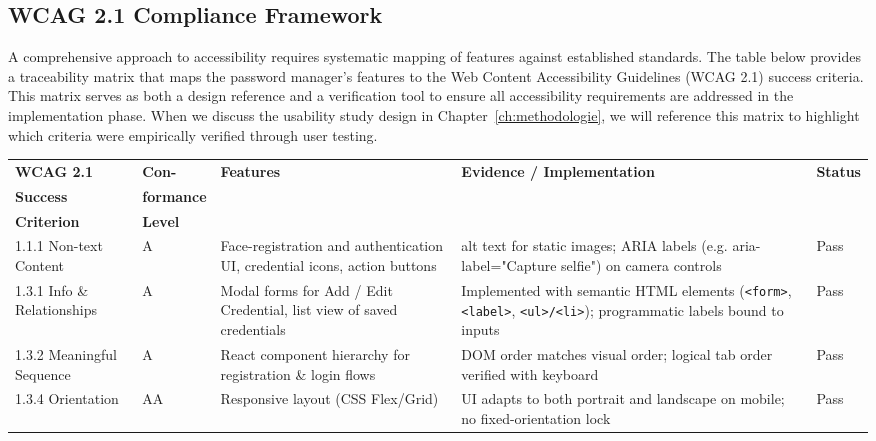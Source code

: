 \subsection{WCAG 2.1 Compliance Framework}
A comprehensive approach to accessibility requires systematic mapping of features against established standards. The table below provides a traceability matrix that maps the password manager's features to the Web Content Accessibility Guidelines (WCAG 2.1) success criteria. This matrix serves as both a design reference and a verification tool to ensure all accessibility requirements are addressed in the implementation phase. When we discuss the usability study design in Chapter~\ref{ch:methodologie}, we will reference this matrix to highlight which criteria were empirically verified through user testing.

\begin{table}[htbp]
  \centering
  \small
  \begin{tabular}{|p{2.5cm}|p{1.5cm}|p{4cm}|p{4cm}|p{1.2cm}|}
    \hline
    \textbf{WCAG 2.1} & \textbf{Con-} & \textbf{Features} & \textbf{Evidence / Implementation} & \textbf{Status} \\
    \textbf{Success} & \textbf{formance} & & & \\
    \textbf{Criterion} & \textbf{Level} & & & \\ \hline
    
    1.1.1 Non-text Content & A & Face-registration and authentication UI, credential icons, action buttons & alt text for static images; ARIA labels (e.g. aria-label="Capture selfie") on camera controls & Pass \\ \hline
    
    1.3.1 Info \& Relationships & A & Modal forms for Add / Edit Credential, list view of saved credentials & Implemented with semantic HTML elements (\texttt{<form>}, \texttt{<label>}, \texttt{<ul>/<li>}); programmatic labels bound to inputs & Pass \\ \hline
    
    1.3.2 Meaningful Sequence & A & React component hierarchy for registration \& login flows & DOM order matches visual order; logical tab order verified with keyboard & Pass \\ \hline
    
    1.3.4 Orientation & AA & Responsive layout (CSS Flex/Grid) & UI adapts to both portrait and landscape on mobile; no fixed-orientation lock & Pass \\ \hline
    

\end{tabular}
\end{table}
